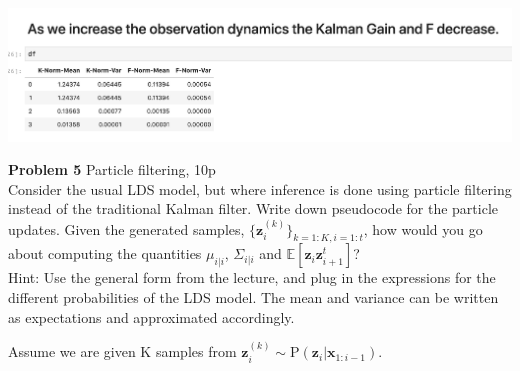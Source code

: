 \documentclass[12pt]{article}
\newcommand{\p}[1]{\mathrm{P}\left(#1 \right)}
\newcommand{\vect}[1]{\mathbf{#1}}
\begin{document}
\begin{center}
	\includegraphics[width=1\linewidth]{figures/problem_4_7.png} 
\end{center}

\noindent \textbf{Problem 5 }  Particle filtering, 10p\\%
Consider the usual LDS model, but where inference is done using particle filtering instead of the traditional Kalman filter. Write down pseudocode for the particle updates. Given the generated samples, $\{\mathbf{z}_i^{(k)}\}_{k=1:K, i=1:t}$, how would you go about computing the quantities $\mu_{i|i}$, $\Sigma_{i|i}$ and $\mathbb{E}[\mathbf{z}_i \mathbf{z}_{i+1}^t]$?\\
Hint: Use the general form from the lecture, and plug in the expressions for the different probabilities of the LDS model. The mean and variance can be written as expectations and approximated accordingly.

Assume we are given K samples from $\vect{z}_i^{(k)} \sim \p{\vect{z}_i | \vect{x}_{1:i-1}}$.
\end{document}
